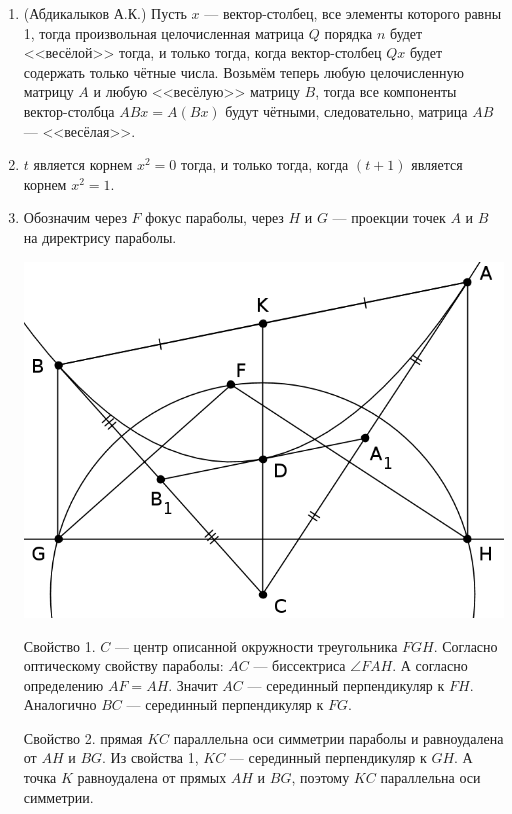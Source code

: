 \begin{enumerate}

\item (Абдикалыков А.К.) Пусть $x$ --- вектор-столбец, все элементы которого равны 1, тогда произвольная целочисленная матрица $Q$ порядка $n$ будет <<весёлой>> тогда, и только тогда, когда вектор-столбец $Qx$ будет содержать только чётные числа. Возьмём теперь любую целочисленную матрицу $A$ и любую <<весёлую>> матрицу $B$, тогда все компоненты вектор-столбца $ABx=A(Bx)$ будут чётными, следовательно, матрица $AB$ --- <<весёлая>>.

\item $t$ является корнем $x^2 = 0$ тогда, и только тогда, когда $(t+1)$ является корнем $x^2 = 1$.

\item Обозначим через $F$ фокус параболы, через $H$ и $G$ --- проекции точек $A$ и $B$ на директрису параболы.

\begin{center}
%
\includegraphics{pictures/2012-2013-3}
\end{center}

Свойство 1. $C$ --- центр описанной окружности треугольника $FGH$. Согласно оптическому свойству параболы: $AC$ --- биссектриса $\angle FAH$. А согласно определению $AF = AH$. Значит $AC$ --- серединный перпендикуляр к $FH$. Аналогично $BC$ --- серединный перпендикуляр к $FG$. 

Свойство 2. прямая $KC$ параллельна оси симметрии параболы и равноудалена от $AH$ и $BG$. Из свойства 1, $KC$ --- серединный перпендикуляр к $GH$. А точка $K$ равноудалена от прямых $AH$ и $BG$, поэтому $KC$ параллельна оси симметрии.


\end{enumerate}
